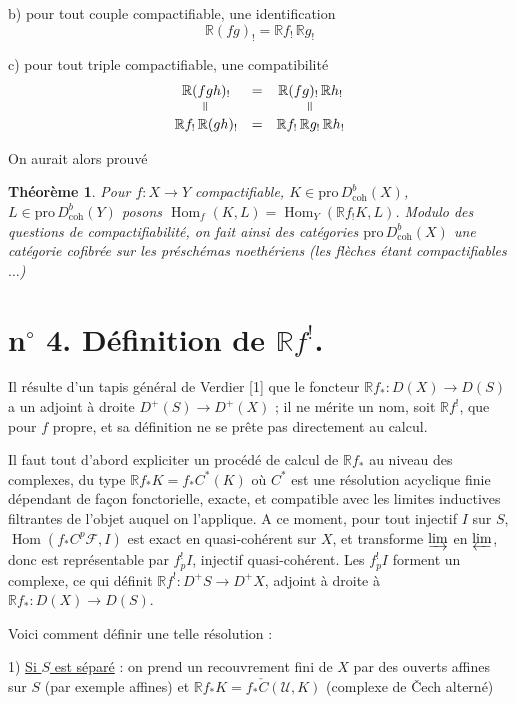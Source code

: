 \documentclass[12pt]{amsart}
\theoremstyle{plain}
\newtheorem{thm}{Théorème}
\theoremstyle{definition}
\DeclareMathOperator{\Hom}{Hom}
\newcommand{\Pro}{\text{pro}\,}
\newcommand{\coh}{\text{coh}}
\newcommand{\cF}{\mathcal{F}}
\newcommand{\cU}{\mathcal{U}}
\newcommand{\cDb}{D^{b}}
\newcommand{\cD}{D}
\newcommand{\bR}{\mathbb{R}}
\begin{document}
b) pour tout couple compactifiable, une identification
\[
\bR(fg)_{!} = \bR f_{!}\,\bR g_{!}
\]

c) pour tout triple compactifiable, une compatibilit\'e
\[
\begin{array}{ccc}
\bR(fgh)_{!} & = & \bR(fg)_{!}\,\bR h_{!} \\
\rotatebox{90}{$=$} & & \rotatebox{90}{$=$} \\
\bR f_{!}\,\bR(gh)_{!} & = & \bR f_{!}\,\bR g_{!}\,\bR h_{!}
\end{array}
\]

On aurait alors prouv\'e

\begin{thm}
Pour $f: X \to Y$ compactifiable, $K \in \Pro\cDb_{\coh}(X)$, $L \in \Pro\cDb_{\coh}(Y)$ posons $\Hom_{f}(K,L) = \Hom_{Y}(\bR f_{!}K, L)$. Modulo des questions de compactifiabilit\'e, on fait ainsi des cat\'egories $\Pro\cDb_{\coh}(X)$ une cat\'egorie cofibr\'ee sur les pr\'esch\'emas noeth\'eriens (les fl\`eches \'etant compactifiables $\ldots$)
\end{thm}

\section*{n$^{\circ}$ 4. D\'efinition de $\bR f^{!}$.}

Il r\'esulte d'un tapis g\'en\'eral de Verdier [1] que le foncteur $\bR f_{*}: \cD(X) \to \cD(S)$ a un adjoint \`a droite $\cD^{+}(S) \to \cD^{+}(X)$ ; il ne m\'erite un nom, soit $\bR f^{!}$, que pour $f$ propre, et sa d\'efinition ne se pr\^ete pas directement au calcul.

Il faut tout d'abord expliciter un proc\'ed\'e de calcul de $\bR f_{*}$ au niveau des complexes, du type $\bR f_{*}K = f_{*}C^{*}(K)$ o\`u $C^{*}$ est une r\'esolution acyclique finie d\'ependant de fa\c{c}on fonctorielle, exacte, et compatible avec les limites inductives filtrantes de l'objet auquel on l'applique. A ce moment, pour tout injectif $I$ sur $S$, $\Hom(f_{*}C^{p}\cF, I)$ est exact en quasi-coh\'erent sur $X$, et transforme $\varinjlim$ en $\varprojlim$, donc est repr\'esentable par $f_{p}^{!}I$, injectif quasi-coh\'erent. Les $f_{p}^{!}I$ forment un complexe, ce qui d\'efinit $\bR f^{!}: \cD^{+}S \to \cD^{+}X$, adjoint \`a droite \`a $\bR f_{*}: \cD(X) \to \cD(S)$.

Voici comment d\'efinir une telle r\'esolution :

1) \underline{Si $S$ est s\'epar\'e} : on prend un recouvrement fini de $X$ par des ouverts affines sur $S$ (par exemple affines) et $\bR f_{*}K = f_{*}\check{C}(\cU, K)$ (complexe de \v{C}ech altern\'e)
\end{document}

